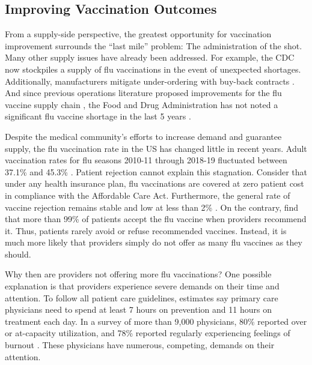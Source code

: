  \subsection{Improving Vaccination Outcomes}
 From a supply-side perspective, the greatest opportunity for vaccination improvement surrounds the “last mile” problem: The administration of the shot. Many other supply issues have already been addressed. For example, the CDC now stockpiles a supply of flu vaccinations in the event of unexpected shortages. Additionally, manufacturers mitigate under-ordering with buy-back contracts \citep[e.g.,][]{Pasternack1985}. And since previous operations literature proposed improvements for the flu vaccine supply chain \citep{Deo2009,Cho2010,Arifoglu2012}, the Food and Drug Administration has not noted a significant flu vaccine shortage in the last 5 years \citep{FDA2020}. 
 
 Despite the medical community’s efforts to increase demand and guarantee supply, the flu vaccination rate in the US has changed little in recent years. Adult vaccination rates for flu seasons 2010-11 through 2018-19 fluctuated between 37.1\% and 45.3\% \citep{CDC2019}. Patient rejection cannot explain this stagnation. Consider that under any health insurance plan, flu vaccinations are covered at zero patient cost in compliance with the Affordable Care Act. Furthermore, the general rate of vaccine rejection remains stable and low at less than 2\% \citep{Brewer2017}. On the contrary, \cite{Patel2017} find that more than 99\% of patients accept the flu vaccine when providers recommend it. Thus, patients rarely avoid or refuse recommended vaccines. Instead, it is much more likely that providers simply do not offer as many flu vaccines as they should. 
 
 Why then are providers not offering more flu vaccinations? One possible explanation is that providers experience severe demands on their time and attention. To follow all patient care guidelines, estimates say primary care physicians need to spend at least 7 hours on prevention \citep{Yarnall2003} and 11 hours on treatment \citep{Ostbye2005} each day. In a survey of more than 9,000 physicians, 80\% reported over or at-capacity utilization, and 78\% reported regularly experiencing feelings of burnout \citep{ThePhysiciansFoundation2018}. These physicians have numerous, competing, demands on their attention.
 
